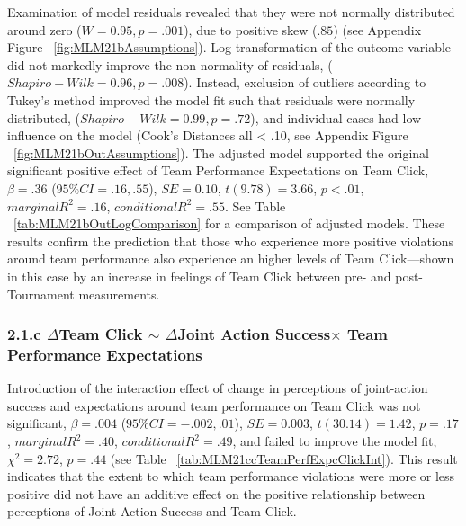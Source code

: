 Examination of model residuals revealed that they were not normally distributed around zero ($W = 0.95, p = .001$), due to positive skew ($.85$) (see Appendix Figure ~\ref{fig:MLM21bAssumptions}).  Log-transformation of the outcome variable did not markedly improve the non-normality of residuals, ($Shapiro-Wilk = 0.96, p = .008$).  Instead, exclusion of outliers according to Tukey's method improved the model fit such that residuals were normally distributed, ($Shapiro-Wilk = 0.99, p = .72$), and individual cases had low influence on the model (Cook's Distances all < .10, see Appendix Figure ~\ref{fig:MLM21bOutAssumptions}).
The adjusted model supported the original significant positive effect of Team Performance Expectations on Team Click, $\beta = .36$ ($95\% CI =  .16, .55$), $SE = 0.10$, $t(9.78) = 3.66$, $p < .01$, $marginal R^2 = .16$, $conditional R^2 = .55$.  See Table ~\ref{tab:MLM21bOutLogComparison} for a comparison of adjusted models. These results confirm the prediction that those who experience more positive violations around team performance also experience an higher levels of Team Click---shown in this case by an increase in feelings of Team Click between pre- and post-Tournament measurements.









\subsubsection{2.1.c $\Delta$Team Click $\sim$ $\Delta$Joint Action Success$\times$ Team Performance Expectations}
Introduction of the interaction effect of change in perceptions of joint-action success and expectations around team performance on Team Click was not significant, $\beta = .004$ ($95\% CI =  -.002, .01$), $SE = 0.003$, $t(30.14) = 1.42$, $p = .17$, $marginal R^2 = .40$, $conditional R^2 = .49$, and failed to improve the model fit, $\chi^2 = 2.72$, $ p = .44$ (see Table ~\ref{tab:MLM21ccTeamPerfExpcClickInt}).  This result indicates that the extent to which team performance violations were more or less positive did not have an additive effect on the positive relationship between perceptions of Joint Action Success and Team Click.



